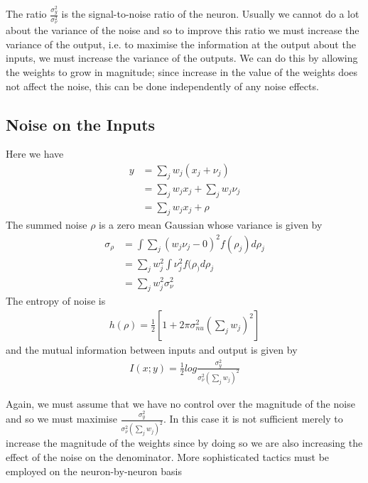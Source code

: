 \documentclass[class=article, crop=false]{standalone}
\numberwithin{equation}{section}
\begin{document}
The ratio $\frac{\sigma_y^2}{\sigma_{\nu}^2}$ is the signal-to-noise ratio of the neuron. Usually we cannot do a lot about the variance of the noise and so to improve this ratio we must increase the variance of the output, i.e. to maximise the information at the output about the inputs, we must increase the variance of the outputs. We can do this by allowing the weights to grow in magnitude; since increase in the value of the weights does not affect the noise, this can be done independently of any noise effects.

\subsection{Noise on the Inputs}
Here we have
\begin{align*}
    y&=\sum\limits_j w_j(x_j+\nu_j)\\
    &=\sum\limits_j w_jx_j + \sum\limits_j w_j\nu_j\\
    &=\sum\limits_j w_jx_j + \rho
\end{align*}
The summed noise $\rho$ is a zero mean Gaussian  whose variance is given by
\begin{align*}
    \sigma_{\rho}&=\int \sum\limits_j (w_j\nu_j-0)^2f(\rho_j)d\rho_j\\
    &=\sum\limits_jw_j^2\int\nu_j^2f(\rho_)d\rho_j\\
    &=\sum\limits_j w_j^2\sigma_{\nu}^2
\end{align*}
The entropy of noise is 
\begin{align}
    h(\rho)=\frac{1}{2}[1 + 2\pi\sigma_{nu}^2(\sum\limits_j w_j)^2]
\end{align}
and the mutual information between inputs and output is given by
\begin{align}
    I(x;y)=\frac{1}{2}log\frac{\sigma_y^2}{\sigma_{\nu}^2(\sum\limits_j w_j)^2}
\end{align}

Again, we must assume that we have no control over the magnitude of the noise and so we must maximise $\frac{\sigma_y^2}{\sigma_{\nu}^2(\sum\limits_j w_j)^2}$. In this case it is not sufficient merely to increase the magnitude of the weights since by doing so we are also increasing the effect of the noise on the denominator. More sophisticated tactics must be employed on the neuron-by-neuron basis 
\end{document}
